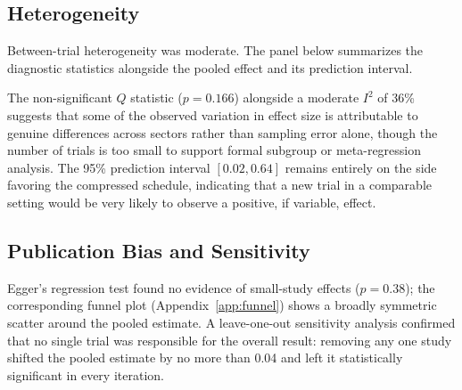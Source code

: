 \subsection{Heterogeneity}

Between-trial heterogeneity was moderate. The panel below summarizes the diagnostic
statistics alongside the pooled effect and its prediction interval.

\begin{minipage}{0.31\linewidth}
\end{minipage}\hfill
\begin{minipage}{0.31\linewidth}
\end{minipage}\hfill
\begin{minipage}{0.31\linewidth}
\end{minipage}
\par\vspace{6pt}
\begin{minipage}{0.31\linewidth}
\end{minipage}\hfill
\begin{minipage}{0.31\linewidth}
\end{minipage}\hfill
\begin{minipage}{0.31\linewidth}
\end{minipage}
\par

The non-significant $Q$ statistic ($p = 0.166$) alongside a moderate $I^2$ of 36\% suggests
that some of the observed variation in effect size is attributable to genuine differences
across sectors rather than sampling error alone, though the number of trials is too small to
support formal subgroup or meta-regression analysis. The 95\% prediction interval
$[0.02, 0.64]$ remains entirely on the side favoring the compressed schedule, indicating
that a new trial in a comparable setting would be very likely to observe a positive, if
variable, effect.

\subsection{Publication Bias and Sensitivity}
\label{sec:pubbias}

Egger's regression test found no evidence of small-study effects ($p = 0.38$); the
corresponding funnel plot (Appendix~\ref{app:funnel}) shows a broadly symmetric scatter
around the pooled estimate. A leave-one-out sensitivity analysis confirmed that no single
trial was responsible for the overall result: removing any one study shifted the pooled
estimate by no more than 0.04 and left it statistically significant in every iteration.
